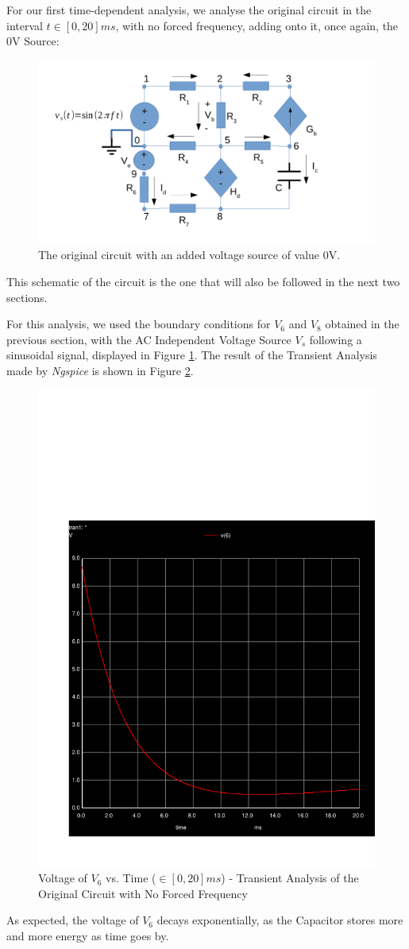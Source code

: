 For our first time-dependent analysis, we analyse the original circuit in the interval $t \in [0, 20]ms$, with no forced frequency, adding onto it, once again, the 0V Source:

\begin{figure}[h] \centering
\includegraphics[width=0.5\linewidth]{t2-sim345.pdf}
\caption{The original circuit with an added voltage source of value 0V.}
\label{fig:sim345}
\end{figure}

This schematic of the circuit is the one that will also be followed in the next two sections.

For this analysis, we used the boundary conditions for $V_6$ and $V_8$ obtained in the previous section, with the AC Independent Voltage Source $V_s$ following a sinusoidal signal, displayed in Figure \ref{fig:sim345}. The result of the Transient Analysis made by \textit{Ngspice} is shown in Figure \ref{fig:sim-graph3}.

\begin{figure}[h] \centering
\includegraphics[width=0.4\linewidth]{../sim/trans3.pdf}
\caption{Voltage of $V_6$ vs. Time ($\in [0, 20]ms$) - Transient Analysis of the Original Circuit with No Forced Frequency}
\label{fig:sim-graph3}
\end{figure}

As expected, the voltage of $V_6$ decays exponentially, as the Capacitor stores more and more energy as time goes by.